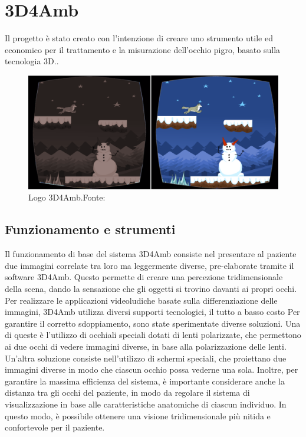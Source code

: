 \documentclass[
a4paper,
cleardoublepage=empty,
headings=twolinechapter,
numbers=autoenddot,
]{scrbook}
\begin{document}
	\chapter{3D4Amb}
    Il progetto è stato creato con l'intenzione di creare uno strumento utile ed economico per il trattamento e la misurazione dell'occhio pigro, basato sulla tecnologia 3D..
	\begin{figure}[h]
		\centering
		\includegraphics[width=0.8\linewidth]{image/3D4Amb}
		\caption{Logo 3D4Amb.Fonte:\cite{3d4amb}}
		\label{fig:3D4Amb}
	\end{figure}
	\section{Funzionamento e strumenti}
	Il funzionamento di base del sistema 3D4Amb consiste nel presentare al paziente due immagini correlate tra loro ma leggermente diverse, pre-elaborate tramite il software 3D4Amb. Questo permette di creare una percezione tridimensionale della scena, dando la sensazione che gli oggetti si trovino davanti ai propri occhi.
	Per realizzare le applicazioni videoludiche basate sulla differenziazione delle immagini, 3D4Amb utilizza diversi supporti tecnologici, il tutto a basso costo
	Per garantire il corretto sdoppiamento, sono state sperimentate diverse soluzioni. Una di queste è l'utilizzo di occhiali speciali dotati di lenti polarizzate, che permettono ai due occhi di vedere immagini diverse, in base alla polarizzazione delle lenti. Un'altra soluzione consiste nell'utilizzo di schermi speciali, che proiettano due immagini diverse in modo che ciascun occhio possa vederne una sola.
	Inoltre, per garantire la massima efficienza del sistema, è importante considerare anche la distanza tra gli occhi del paziente, in modo da regolare il sistema di visualizzazione in base alle caratteristiche anatomiche di ciascun individuo. In questo modo, è possibile ottenere una visione tridimensionale più nitida e confortevole per il paziente.
\end{document}
